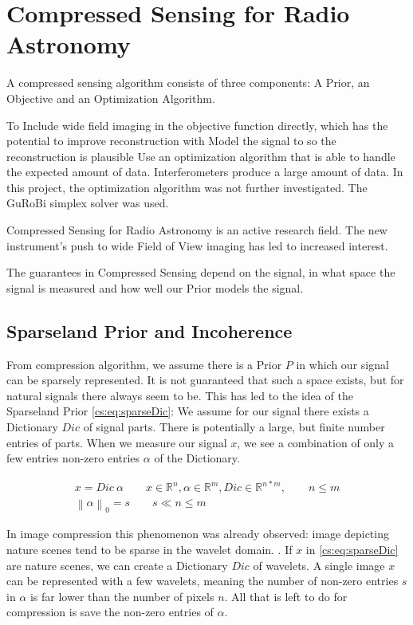 \section{Compressed Sensing for Radio Astronomy} \label{cs}
A compressed sensing algorithm consists of three components: A Prior, an Objective and an Optimization Algorithm. 

To Include wide field imaging in the objective function directly, which has the potential to improve reconstruction with 
Model the signal to so the reconstruction is plausible
Use an optimization algorithm that is able to handle the expected amount of data. Interferometers produce a large amount of data. In this project, the optimization algorithm was not further investigated. The GuRoBi simplex solver was used.

Compressed Sensing for Radio Astronomy is an active research field. The new instrument's push to wide Field of View imaging has led to increased interest. 

The guarantees in Compressed Sensing depend on the signal, in what space the signal is measured and how well our Prior models the signal. 


\subsection{Sparseland Prior and Incoherence}
From compression algorithm, we assume there is a Prior $P$ in which our signal can be sparsely represented. It is not guaranteed that such a space exists, but for natural signals there always seem to be. This has led to the idea of the Sparseland Prior \eqref{cs:eq:sparseDic}: We assume for our signal there exists a Dictionary $Dic$ of signal parts. There is potentially a large, but finite number entries of parts. When we measure our signal $x$, we see a combination of only a few entries non-zero entries $\alpha$ of the Dictionary. 

\begin{equation} \label{cs:eq:sparseDic}
	\begin{split}
		x = Dic \: \alpha  \qquad  x \in \mathbb{R}^{n}, \alpha \in \mathbb{R}^{m}, Dic \in \mathbb{R}^{n*m}, \qquad n \leq m \\
		\left \| \alpha \right \|_0 = s \qquad s \ll n \leq m
	\end{split}
\end{equation}

In image compression this phenomenon was already observed: image depicting nature scenes tend to be sparse in the wavelet domain. . If $x$ in \eqref{cs:eq:sparseDic} are nature scenes, we can create a Dictionary $Dic$ of wavelets. A single image $x$ can be represented with a few wavelets, meaning the number of non-zero entries $s$ in $\alpha$ is far lower than the number of pixels $n$. All that is left to do for compression is save the non-zero entries of $\alpha$.

